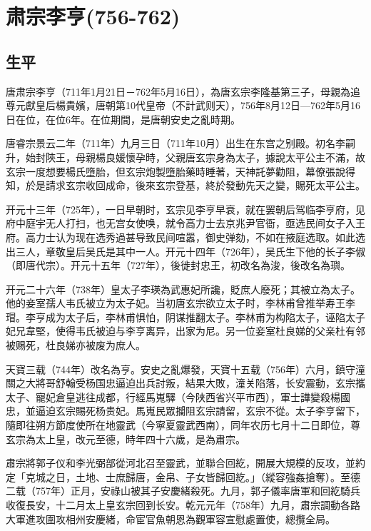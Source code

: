 
\section{肃宗李亨\tiny(756-762)}

\subsection{生平}

唐肃宗李亨（711年1月21日－762年5月16日），為唐玄宗李隆基第三子，母親為追尊元獻皇后楊貴嬪，唐朝第10代皇帝（不計武则天），756年8月12日—762年5月16日在位，在位6年。在位期間，是唐朝安史之亂時期。

唐睿宗景云二年（711年）九月三日（711年10月）出生在东宫之别殿。初名李嗣升，始封陝王，母親楊良媛懷孕時，父親唐玄宗身為太子，據說太平公主不滿，故玄宗一度想要楊氏墮胎，但玄宗炮製墮胎藥時睡著，天神託夢勸阻，幕僚張說得知，於是請求玄宗收回成命，後來玄宗登基，終於發動先天之變，賜死太平公主。

开元十三年（725年），一日早朝时，玄宗见李亨早衰，就在罢朝后驾临李亨府，见府中庭宇无人打扫，也无宫女使唤，就令高力士去京兆尹官衙，亟选民间女子入王府。高力士认为现在选秀過甚导致民间喧嚣，御史弹劾，不如在掖庭选取。如此选出三人，章敬皇后吴氏是其中一人。开元十四年（726年），吴氏生下他的长子李俶（即唐代宗）。开元十五年（727年），後徙封忠王，初改名為浚，後改名為璵。

开元二十六年（738年）皇太子李瑛為武惠妃所讒，貶庶人廢死；其被立為太子。他的妾室孺人韦氏被立为太子妃。当初唐玄宗欲立太子时，李林甫曾推举寿王李瑁。李亨成为太子后，李林甫惧怕，阴谋推翻太子。李林甫为构陷太子，诬陷太子妃兄韋堅，使得韦氏被迫与李亨离异，出家为尼。另一位妾室杜良娣的父亲杜有邻被赐死，杜良娣亦被废为庶人。

天寶三载（744年）改名為亨。安史之亂爆發，天寶十五载（756年）六月，鎮守潼關之大將哥舒翰受杨国忠逼迫出兵討叛，結果大敗，潼关陷落，长安震動，玄宗攜太子、寵妃倉皇逃往成都，行經馬嵬驛（今陕西省兴平市西），軍士譁變殺楊國忠，並逼迫玄宗賜死杨贵妃。馬嵬民眾攔阻玄宗請留，玄宗不從。太子李亨留下，隨即往朔方節度使所在地靈武（今寧夏靈武西南），同年农历七月十二日即位，尊玄宗為太上皇，改元至德，時年四十六歲，是為肅宗。

肅宗將郭子仪和李光弼部從河北召至靈武，並聯合回紇，開展大規模的反攻，並約定「克城之日，土地、士庶歸唐，金帛、子女皆歸回紇。」（縱容強姦搶奪）。至德二载（757年）正月，安祿山被其子安慶緒殺死。九月，郭子儀率唐軍和回紇騎兵收復長安，十二月太上皇玄宗回到长安。乾元元年（758年）九月，肅宗調動各路大軍進攻圍攻相州安慶緒，命宦官魚朝恩為觀軍容宣慰處置使，總攬全局。

